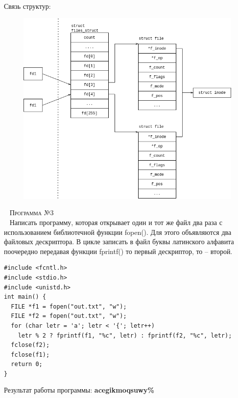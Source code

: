 Связь структур:
\begin{figure}[H]
	\centering
	\includegraphics[scale=0.65]{assets/d_2.png}
\end{figure}


~\newline
\textsc{\huge Программа №3} \\
~\newline
Написать программу, которая открывает один и тот же файл два раза с использованием библиотечной функции fopen(). Для этого объявляются два файловых дескриптора. В цикле записать в файл буквы латинского алфавита поочередно передавая функции fprintf() то первый дескриптор, то – второй.

\begin{lstlisting}
#include <fcntl.h>
#include <stdio.h>
#include <unistd.h>
int main() {
  FILE *f1 = fopen("out.txt", "w");
  FILE *f2 = fopen("out.txt", "w");
  for (char letr = 'a'; letr < '{'; letr++)
    letr % 2 ? fprintf(f1, "%c", letr) : fprintf(f2, "%c", letr);
  fclose(f2);
  fclose(f1);
  return 0;
}
\end{lstlisting}
Результат работы программы:
\textbf{acegikmoqsuwy\%}

